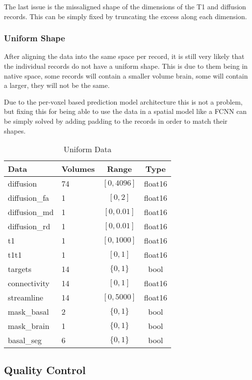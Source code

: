The last issue is the missaligned shape of the dimensions of the T1 and diffusion records. This can be simply fixed by truncating the excess along each dimension.

\subsubsection{Uniform Shape}
After aligning the data into the same space per record, it is still very likely that the individual records do not have a uniform shape. This is due to them being in native space, some records will contain a smaller volume brain, some will contain a larger, they will not be the same.\par
Due to the per-voxel based prediction model architecture this is not a problem, but fixing this for being able to use the data in a spatial model like a \ac{FCNN} can be simply solved by adding padding to the records in order to match their shapes.
\begin{table}[H]
\centering
\begin{tabular}{|l|l|c|c|}
\hline
\textbf{Data} & \textbf{Volumes} & \textbf{Range} & \textbf{Type} \\ \hline
diffusion & 74 & $[0,4096]$ & float16 \\ \hline
diffusion\_fa & 1 & $[0,2]$ & float16 \\ \hline
diffusion\_md & 1 & $[0,0.01]$ & float16 \\ \hline
diffusion\_rd & 1 & $[0,0.01]$ & float16 \\ \hline
t1 & 1 & $[0,1000]$ & float16 \\ \hline
t1t1 & 1 & $[0,1]$ & float16 \\ \hline
targets & 14 & $\{0,1\}$ & bool \\ \hline
connectivity & 14 & $[0,1]$ & float16 \\ \hline
streamline & 14 & $[0,5000]$ & float16 \\ \hline
mask\_basal & 2 & $\{0,1\}$ & bool \\ \hline
mask\_brain & 1 & $\{0,1\}$ & bool \\ \hline
basal\_seg & 6 & $\{0,1\}$ & bool \\ \hline
\end{tabular}
\caption{Uniform Data}
\label{tab:datas2}
\end{table}

\subsection{Quality Control}

